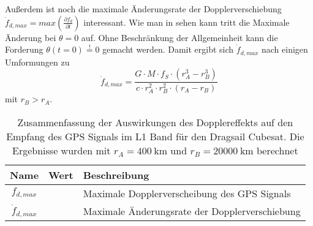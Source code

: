 Außerdem ist noch die maximale Änderungsrate der Dopplerverschiebung  $\dot f_{d,max}=max\left(\frac{\partial f_d}{\partial t}\right)$ interessant. Wie man in  sehen kann tritt die Maximale Änderung bei $\theta=0$ auf. Ohne Beschränkung der Allgemeinheit kann die Forderung $\theta(t=0)\overset{!}{=}0$ gemacht werden. Damit ergibt sich $\dot f_{d,max}$ nach einigen Umformungen zu
\begin{equation}
	\dot f_{d,max}= \frac{G \cdot  M \cdot  f_S \cdot  (r_A^3-r_B^3)}{c \cdot  r_A^2 \cdot  r_B^2\cdot  (r_A-r_B)}
\end{equation}
mit $r_B>r_A$.

\begin{table}[htbp]
    \ttabbox
    {
        \caption{Zusammenfassung der Auswirkungen des Dopplereffekts auf den Empfang des GPS Signals im L1 Band für den Dragsail Cubesat. Die Ergebnisse wurden mit $r_A=\SI{400}{\km}$ und $r_B=\SI{20000}{\km}$ berechnet}
        \label{TabDoppler}
    }
    {
    \begin{tabular}{c c p{7.5cm}}
        \toprule
        Name             & Wert & Beschreibung \\
        \midrule
        $f_{d,max}$ &  &  Maximale Dopplerverscheibung des GPS Signals\\
        $\dot f_{d,max}$ & & Maximale Änderungsrate der Dopplerverschiebung \\
        \bottomrule
    \end{tabular}
}
\end{table}
